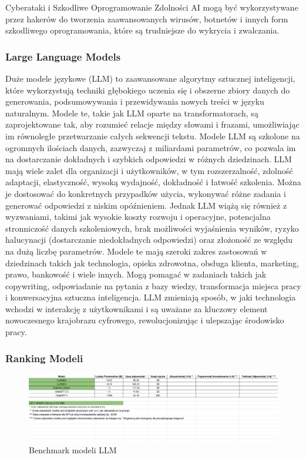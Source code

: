 Cyberataki i Szkodliwe Oprogramowanie
Zdolności AI mogą być wykorzystywane przez hakerów do tworzenia zaawansowanych wirusów, botnetów i innych form szkodliwego oprogramowania, które są trudniejsze do wykrycia i zwalczania.



\subsubsection{Large Language Models}
Duże modele językowe (LLM) to zaawansowane algorytmy sztucznej inteligencji, które wykorzystują techniki głębokiego uczenia się i obszerne zbiory danych do generowania, podsumowywania i przewidywania nowych treści w języku naturalnym. Modele te, takie jak LLM oparte na transformatorach, są zaprojektowane tak, aby rozumieć relacje między słowami i frazami, umożliwiając im równoległe przetwarzanie całych sekwencji tekstu. Modele LLM są szkolone na ogromnych ilościach danych, zazwyczaj z miliardami parametrów, co pozwala im na dostarczanie dokładnych i szybkich odpowiedzi w różnych dziedzinach. LLM mają wiele zalet dla organizacji i użytkowników, w tym rozszerzalność, zdolność adaptacji, elastyczność, wysoką wydajność, dokładność i łatwość szkolenia. Można je dostosować do konkretnych przypadków użycia, wykonywać różne zadania i generować odpowiedzi z niskim opóźnieniem. Jednak LLM wiążą się również z wyzwaniami, takimi jak wysokie koszty rozwoju i operacyjne, potencjalna stronniczość danych szkoleniowych, brak możliwości wyjaśnienia wyników, ryzyko halucynacji (dostarczanie niedokładnych odpowiedzi) oraz złożoność ze względu na dużą liczbę parametrów. Modele te mają szeroki zakres zastosowań w dziedzinach takich jak technologia, opieka zdrowotna, obsługa klienta, marketing, prawo, bankowość i wiele innych. Mogą pomagać w zadaniach takich jak copywriting, odpowiadanie na pytania z bazy wiedzy, transformacja miejsca pracy i konwersacyjna sztuczna inteligencja. LLM zmieniają sposób, w jaki technologia wchodzi w interakcję z użytkownikami i są uważane za kluczowy element nowoczesnego krajobrazu cyfrowego, rewolucjonizując i ulepszając środowisko pracy.

\subsubsection{Ranking Modeli}

\begin{figure}[h]
    \centering
    \includegraphics[width=1\textwidth]{Obrazy/llms_benchmark.png}
    \caption{Benchmark modeli LLM}
    \label{fig:my_label}
\end{figure}



